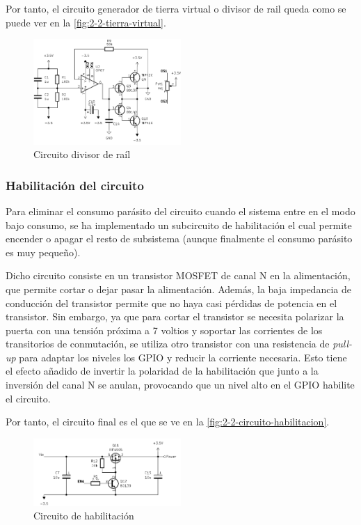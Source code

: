 Por tanto, el circuito generador de tierra virtual o divisor de rail queda como se puede ver en la \autoref{fig:2-2-tierra-virtual}.

\begin{figure}[h]
    \centering
    \includegraphics[width=0.5\textwidth]{images/2/2-2/circuitoDivisorRail.png}
    \caption{Circuito divisor de raíl}
    \label{fig:2-2-tierra-virtual}
\end{figure}

\subsubsection{Habilitación del circuito}

Para eliminar el consumo parásito del circuito cuando el sistema entre en el modo bajo consumo, se ha implementado un subcircuito de habilitación el cual permite encender o apagar el resto de subsistema (aunque finalmente el consumo parásito es muy pequeño).

Dicho circuito consiste en un transistor MOSFET de canal N en la alimentación, que permite cortar o dejar pasar la alimentación. Además, la baja impedancia de conducción del transistor permite que no haya casi pérdidas de potencia en el transistor. Sin embargo, ya que para cortar el transistor se necesita polarizar la puerta con una tensión próxima a 7 voltios y soportar las corrientes de los transitorios de conmutación, se utiliza otro transistor con una resistencia de \textit{pull-up} para adaptar los niveles los GPIO y reducir la corriente necesaria. Esto tiene el efecto añadido de invertir la polaridad de la habilitación que junto a la inversión del canal N se anulan, provocando que un nivel alto en el GPIO habilite el circuito. 

Por tanto, el circuito final es el que se ve en la \autoref{fig:2-2-circuito-habilitacion}.

\begin{figure}[h]
    \centering
    \includegraphics[width=0.5\textwidth]{images/2/2-2/circuitoHabilitacion.png}
    \caption{Circuito de habilitación}
    \label{fig:2-2-circuito-habilitacion}
\end{figure}

